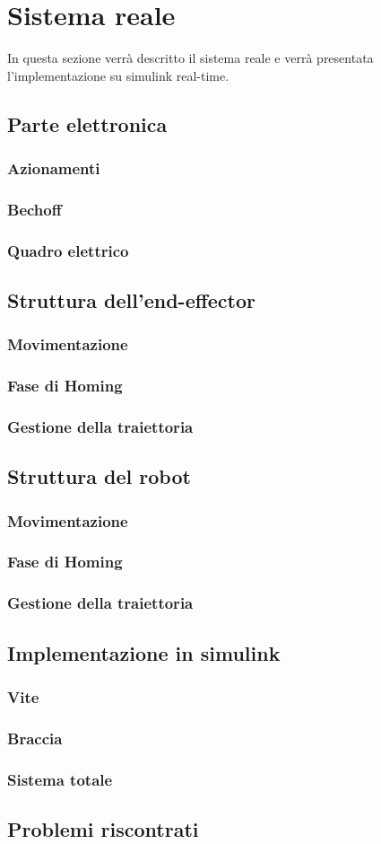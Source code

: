\section{Sistema reale}
In questa sezione verrà descritto il sistema reale e verrà presentata l'implementazione su simulink real-time.
\subsection{Parte elettronica}
\subsubsection{Azionamenti}
\subsubsection{Bechoff}
\subsubsection{Quadro elettrico}
\subsection{Struttura dell'end-effector}
\subsubsection{Movimentazione}
\subsubsection{Fase di Homing}
\subsubsection{Gestione della traiettoria}
\subsection{Struttura del robot}
\subsubsection{Movimentazione}
\subsubsection{Fase di Homing}
\subsubsection{Gestione della traiettoria}
\subsection{Implementazione in simulink}
\subsubsection{Vite}
\subsubsection{Braccia}
\subsubsection{Sistema totale}
\subsection{Problemi riscontrati}